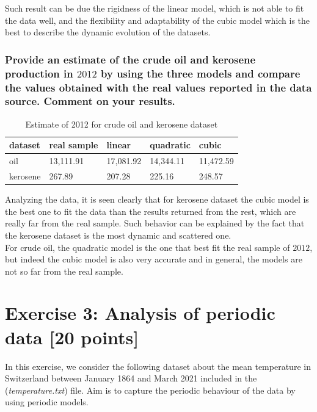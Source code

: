 \documentclass[unicode,11pt,a4paper,oneside,numbers=endperiod,openany]{scrartcl}
\begin{document}
Such result can be due the rigidness of the linear model, which is not able to fit the data well,
and the flexibility and adaptability of the cubic model which is the best to describe the dynamic evolution of the datasets.

\subsubsection*{
    Provide an estimate of the crude oil and kerosene production in $2012$ by using
    the three models and compare the values obtained with the real values reported in the data source. Comment on
    your results.}

\begin{table}[H]
    \centering
    \caption{Estimate of 2012 for crude oil and kerosene dataset}
    \label{table:ex2d}
    \begin{tabular}{||l l l l l||}
        \hline
        dataset  & real sample & linear    & quadratic & cubic     \\
        \hline\hline
        oil      & 13,111.91   & 17,081.92 & 14,344.11 & 11,472.59 \\
        kerosene & 267.89      & 207.28    & 225.16    & 248.57    \\
        \hline
    \end{tabular}
\end{table}

Analyzing the data, it is seen clearly that for kerosene dataset the cubic model is the best one to fit the data
than the results returned from the rest, which are really far from the real sample.
Such behavior can be explained by the fact that the kerosene dataset is the most dynamic and scattered one.\\
For crude oil, the quadratic model is the one that best fit the real sample of $2012$, but indeed the cubic model
is also very accurate and in general, the models are not so far from the real sample.\\

\section*{Exercise 3: Analysis of periodic data [20 points]}

In this exercise, we consider the following dataset about the mean temperature in Switzerland
between January 1864 and March 2021 included in the (\textit{temperature.txt}) file.
Aim is to capture the periodic behaviour of the data by using periodic models.\\
\end{document}
